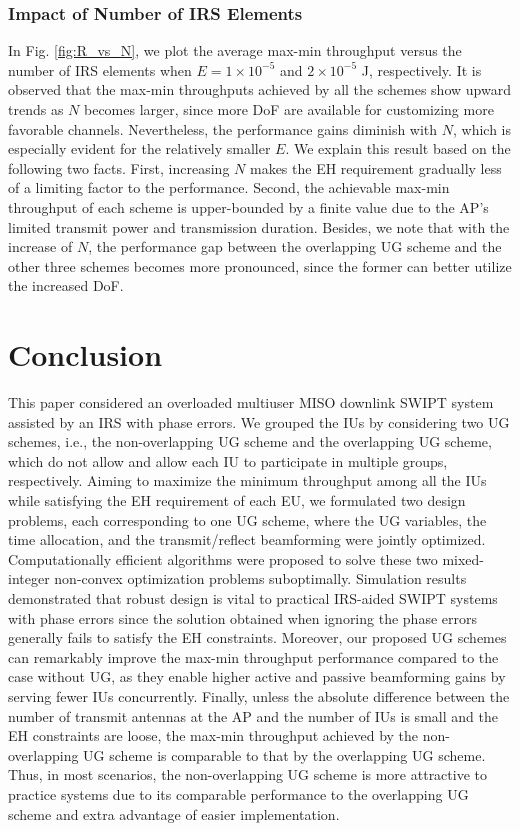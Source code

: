 \documentclass[12pt,draftclsnofoot, onecolumn]{IEEEtran}
\theoremstyle{plain}
\begin{document}
\begin{sloppypar}
\subsubsection{Impact of Number of IRS Elements}
In Fig. \ref{fig:R_vs_N}, we plot the average max-min throughput versus the number of IRS elements when $E = 1 \times 10^{-5}$ and $2 \times 10^{-5}$ J, respectively. It is observed that the max-min throughputs achieved by all the schemes show upward trends as $N$ becomes larger, since more DoF are available for customizing more favorable channels. Nevertheless, the performance gains diminish with $N$, which is especially evident for the relatively smaller $E$. We explain this result based on the following two facts. First, increasing $N$ makes the EH requirement gradually less of a limiting factor to the performance. Second, the achievable max-min throughput of each scheme is upper-bounded by a finite value due to the AP's limited transmit power and transmission duration. Besides, we note that with the increase of $N$, the performance gap between the overlapping UG scheme and the other three schemes becomes more pronounced, since the former can better utilize the increased DoF. 

\section{Conclusion}\label{Sec:conclusion}
This paper considered an overloaded multiuser MISO downlink SWIPT system assisted by an IRS with phase errors. We grouped the IUs by considering two UG schemes, i.e., the non-overlapping UG scheme and the overlapping UG scheme, which do not allow and allow each IU to participate in multiple groups, respectively. Aiming to maximize the minimum throughput among all the IUs while satisfying the EH requirement of each EU, we formulated two design problems, each corresponding to one UG scheme, where the UG variables, the time allocation, and the transmit/reflect beamforming were jointly optimized. Computationally efficient algorithms were proposed to solve these two mixed-integer non-convex optimization problems suboptimally. Simulation results demonstrated that robust design is vital to practical IRS-aided SWIPT systems with phase errors since the solution obtained when ignoring the phase errors generally fails to satisfy the EH constraints.  
Moreover, our proposed UG schemes can remarkably improve the max-min throughput performance compared to the case without UG, as they enable higher active and passive beamforming gains by serving fewer IUs concurrently. 
Finally, unless the absolute difference between the number of transmit antennas at the AP and the number of IUs is small and the EH constraints are loose, the max-min throughput achieved by the non-overlapping UG scheme is comparable to that by the overlapping UG scheme. Thus, in most scenarios, the non-overlapping UG scheme is more attractive to practice systems due to its comparable performance to the overlapping UG scheme and extra advantage of easier implementation. %



\end{sloppypar}
\end{document}
